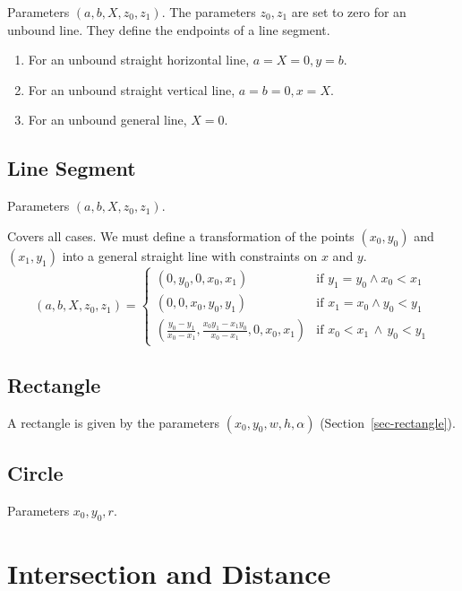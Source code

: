 \documentclass[11pt]{article}
\begin{document}
Parameters $(a, b, X, z_0, z_1)$.
The parameters $z_0, z_1$ are set to zero for an unbound line. They define
the endpoints of a line segment.

\begin{enumerate}
    \item For an unbound straight horizontal line, $a=X=0, y=b$.
    \item For an unbound straight vertical line, $a=b=0, x=X$.
    \item For an unbound general line, $X=0$.
\end{enumerate}

\subsection{Line Segment}
\label{sec-representation-line-segment}

Parameters $(a, b, X, z_0, z_1)$.

Covers all cases. We must define a transformation of the points $(x_0, y_0)$
and $(x_1, y_1)$  into a general straight line with constraints on $x$ and $y$.
\begin{equation}
    (a, b, X, z_0, z_1) =
    \begin{cases}
        (0, y_0, 0, x_0, x_1)  &
        \text{if $y_1 = y_0\land x_0 < x_1$}\\
        (0, 0, x_0, y_0, y_1) &
        \text{if $x_1 = x_0\land  y_0 < y_1 $}\\
        \left(\frac{y_0 - y_1}{x_0-x_1},
            \frac{x_0 y_1 - x_1 y_0}{x_0 - x_1}, 0, x_0, x_1\right) &
            \text{if $x_0< x_1\,\land\,y_0< y_1$}
    \end{cases}
\end{equation}

\subsection{Rectangle}

A rectangle is given by the parameters $(x_0, y_0, w, h, \alpha)$
(Section~\ref{sec-rectangle}).


\subsection{Circle}

Parameters $x_0, y_0, r$.


\section{Intersection and Distance}
\label{sec-intersection-distance}
\end{document}
